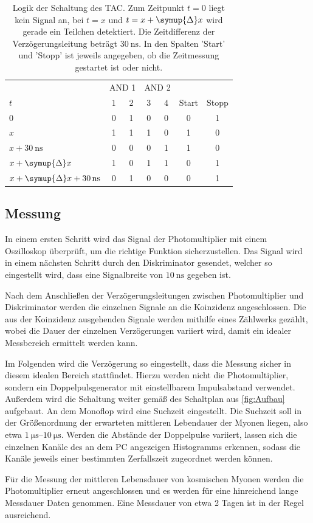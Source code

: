  \begin{table}
    \centering
    \caption{Logik der Schaltung des TAC. Zum Zeitpunkt $t=0$ liegt kein Signal an, bei $t=x$ und $t=x+\symup{\Delta}x$ wird gerade ein Teilchen detektiert. %
    Die Zeitdifferenz der Verzögerungsleitung beträgt $\qty{30}{\nano\second}$. In den Spalten 'Start' und 'Stopp' ist jeweils angegeben, ob die Zeitmessung %
    gestartet ist oder nicht.}
    \label{tab:Logik}
    \begin{tabular}{l | c c | c c | c c}
      \toprule
      {} & \multicolumn{2}{c|}{AND 1} & \multicolumn{2}{c|}{AND 2} & {} & {} \\
      $t$ & $1$ & $2$ & $3$ & $4$ & Start & Stopp \\
      \midrule
      $0$                                               & 0 & 1 & 0 & 0 & 0 & 1 \\
      $x$                                               & 1 & 1 & 1 & 0 & 1 & 0 \\
      {$x + \qty{30}{\nano\second}$}                    & 0 & 0 & 0 & 1 & 1 & 0 \\
      {$x + \symup{\Delta}x$}                           & 1 & 0 & 1 & 1 & 0 & 1 \\
      {$x + \symup{\Delta}x + \qty{30}{\nano\second}$}  & 0 & 1 & 0 & 0 & 0 & 1 \\      
      
      \bottomrule
    \end{tabular}
  \end{table}

  \subsection{Messung}
  \label{subsec:Messung}
  In einem ersten Schritt wird das Signal der Photomultiplier mit einem Oszilloskop überprüft, um die richtige Funktion sicherzustellen. Das Signal wird in einem nächsten Schritt durch den
  Diskriminator gesendet, welcher so eingestellt wird, dass eine Signalbreite von $\qty{10}{\nano\second}$ gegeben ist.

  Nach dem Anschließen der Verzögerungsleitungen zwischen Photomultiplier und Diskriminator werden die einzelnen Signale an die Koinzidenz angeschlossen. Die aus der Koinzidenz ausgehenden
  Signale werden mithilfe eines Zählwerks gezählt, wobei die Dauer der einzelnen Verzögerungen variiert wird, damit ein idealer Messbereich ermittelt werden kann.

  Im Folgenden wird die Verzögerung so eingestellt, dass die Messung sicher in diesem idealen Bereich stattfindet. Hierzu werden nicht die Photomultiplier, sondern
  ein Doppelpulsgenerator mit einstellbarem Impulsabstand verwendet. Außerdem wird die Schaltung weiter gemäß des Schaltplan aus \autoref{fig:Aufbau} aufgebaut. 
  An dem Monoflop wird eine Suchzeit eingestellt. Die Suchzeit soll in der Größenordnung der erwarteten mittleren Lebendauer der Myonen liegen, also etwa $\qtyrange{1}{10}{\micro\second}$.
  Werden die Abstände der Doppelpulse variiert, lassen sich die einzelnen Kanäle des an dem PC angezeigen Histogramms erkennen, sodass die Kanäle jeweils einer bestimmten Zerfallszeit
  zugeordnet werden können.

  Für die Messung der mittleren Lebensdauer von kosmischen Myonen werden die Photomultiplier erneut angeschlossen und es werden für eine hinreichend lange Messdauer Daten genommen. Eine
  Messdauer von etwa 2 Tagen ist in der Regel ausreichend.
